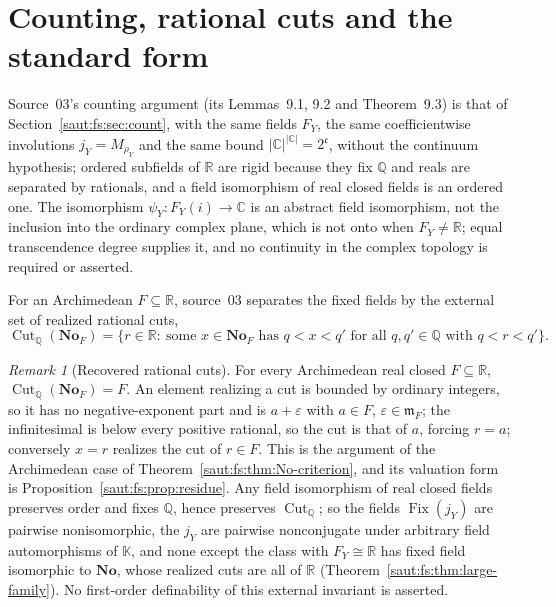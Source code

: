 \documentclass[11pt]{article}
\theoremstyle{definition}
\theoremstyle{remark}
\newtheorem{remark}[theorem]{Remark}
\newcommand{\No}{\mathbf{No}}
\newcommand{\R}{\mathbb R}
\newcommand{\C}{\mathbb C}
\newcommand{\Q}{\mathbb Q}
\newcommand{\K}{\mathbb K}
\newcommand{\mm}{\mathfrak m}
\newcommand{\Fix}{\operatorname{Fix}}
\newcommand{\abs}[1]{\lvert#1\rvert}
\newcommand{\cc}{\mathfrak c}
\numberwithin{equation}{section}
\begin{document}
\section{Counting, rational cuts and the standard form}\label{saut:gr:sec:count}

Source~03's counting argument (its Lemmas~9.1, 9.2 and Theorem~9.3) is that of
Section~\ref{saut:fs:sec:count}, with the same fields $F_Y$, the same coefficientwise
involutions $j_Y=M_{\rho_Y}$ and the same bound $\abs{\C}^{\abs{\C}}=2^{\cc}$, without
the continuum hypothesis; ordered subfields of $\R$ are rigid because they fix $\Q$ and
reals are separated by rationals, and a field isomorphism of real closed fields is an
ordered one. The isomorphism $\psi_Y:F_Y(i)\to\C$ is an abstract field isomorphism,
not the inclusion into the ordinary complex plane, which is not onto when $F_Y\ne\R$;
equal transcendence degree supplies it, and no continuity in the complex topology is
required or asserted.

For an Archimedean $F\subseteq\R$, source~03 separates the fixed fields by the
external set of realized rational cuts,
\begin{equation}\label{saut:gr:eq:cuts}
 \operatorname{Cut}_\Q(\No_F)=\bigl\{r\in\R:\ \text{some }x\in\No_F\text{ has }q<x<q'
 \text{ for all }q,q'\in\Q\text{ with }q<r<q'\bigr\}.
\end{equation}

\begin{remark}[Recovered rational cuts]\label{saut:gr:rem:cuts}
For every Archimedean real closed $F\subseteq\R$, $\operatorname{Cut}_\Q(\No_F)=F$. An
element realizing a cut is bounded by ordinary integers, so it has no negative-exponent
part and is $a+\varepsilon$ with $a\in F$, $\varepsilon\in\mm_F$; the infinitesimal is
below every positive rational, so the cut is that of $a$, forcing $r=a$; conversely
$x=r$ realizes the cut of $r\in F$. This is the argument of the Archimedean case of
Theorem~\ref{saut:fs:thm:No-criterion}, and its valuation form is
Proposition~\ref{saut:fs:prop:residue}. Any field isomorphism of real closed fields
preserves order and fixes $\Q$, hence preserves $\operatorname{Cut}_\Q$; so the fields
$\Fix(j_Y)$ are pairwise nonisomorphic, the $j_Y$ are pairwise nonconjugate under
arbitrary field automorphisms of $\K$, and none except the class with $F_Y\cong\R$ has
fixed field isomorphic to $\No$, whose realized cuts are all of $\R$
(Theorem~\ref{saut:fs:thm:large-family}). No first-order definability of this external
invariant is asserted.
\end{remark}
\end{document}

